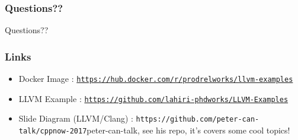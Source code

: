 \documentclass{beamer}
\begin{document}
\begin{frame}
	\frametitle{Questions??}
	Questions??
\end{frame}

\begin{frame}
	\frametitle{Links}
	\begin{itemize}
		\item Docker Image : \texttt{\href{https://hub.docker.com/r/prodrelworks/llvm-examples}{https://hub.docker.com/r/prodrelworks/llvm-examples}}
		\item LLVM Example : \texttt{\href{https://github.com/lahiri-phdworks/LLVM-Examples}{https://github.com/lahiri-phdworks/LLVM-Examples}}
		\item Slide Diagram (LLVM/Clang) : 
		\texttt{https://github.com/peter-can-talk/cppnow-2017}{peter-can-talk, see his repo, it's covers some cool topics!}
	\end{itemize}
\end{frame}
\end{document}
